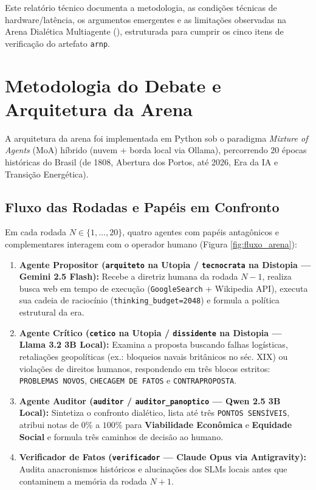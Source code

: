 \documentclass[runningheads]{llncs}
\begin{document}
Este relatório técnico documenta a metodologia, as condições técnicas de hardware/latência, os argumentos emergentes e as limitações observadas na Arena Dialética Multiagente (), estruturada para cumprir os cinco itens de verificação do artefato \texttt{arn\textperiodcentered p}.

\section{Metodologia do Debate e Arquitetura da Arena}
A arquitetura da arena foi implementada em Python sob o paradigma \textit{Mixture of Agents} (MoA) híbrido (nuvem + borda local via Ollama), percorrendo 20 épocas históricas do Brasil (de 1808, Abertura dos Portos, até 2026, Era da IA e Transição Energética).

\subsection{Fluxo das Rodadas e Papéis em Confronto}
Em cada rodada $N \in \{1, \dots, 20\}$, quatro agentes com papéis antagônicos e complementares interagem com o operador humano (Figura \ref{fig:fluxo_arena}):
\begin{enumerate}
    \item \textbf{Agente Propositor (\texttt{arquiteto} na Utopia / \texttt{tecnocrata} na Distopia --- Gemini 2.5 Flash):} Recebe a diretriz humana da rodada $N-1$, realiza busca web em tempo de execução (\texttt{GoogleSearch} + Wikipedia API), executa sua cadeia de raciocínio (\texttt{thinking\_budget=2048}) e formula a política estrutural da era.
    \item \textbf{Agente Crítico (\texttt{cetico} na Utopia / \texttt{dissidente} na Distopia --- Llama 3.2 3B Local):} Examina a proposta buscando falhas logísticas, retaliações geopolíticas (ex.: bloqueios navais britânicos no séc. XIX) ou violações de direitos humanos, respondendo em três blocos estritos: \texttt{PROBLEMAS NOVOS}, \texttt{CHECAGEM DE FATOS} e \texttt{CONTRAPROPOSTA}.
    \item \textbf{Agente Auditor (\texttt{auditor} / \texttt{auditor\_panoptico} --- Qwen 2.5 3B Local):} Sintetiza o confronto dialético, lista até três \texttt{PONTOS SENSÍVEIS}, atribui notas de $0\%$ a $100\%$ para \textbf{Viabilidade Econômica} e \textbf{Equidade Social} e formula três caminhos de decisão ao humano.
    \item \textbf{Verificador de Fatos (\texttt{verificador} --- Claude Opus via Antigravity):} Audita anacronismos históricos e alucinações dos SLMs locais antes que contaminem a memória da rodada $N+1$.
\end{enumerate}
\end{document}
